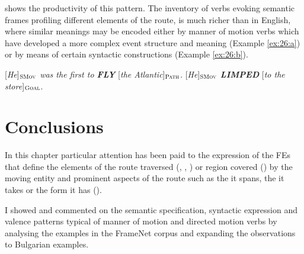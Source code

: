 \documentclass[output=paper,colorlinks,citecolor=brown]{langscibook}
\begin{document}
 shows the productivity of this pattern. The inventory of verbs evoking semantic frames profiling different elements of the route, is much richer than in English, where similar meanings may be encoded either by manner of motion verbs which have developed a more complex event structure and meaning (Example \ref{ex:26:a}) or by means of certain syntactic constructions (Example \ref{ex:26:b}). %

\begin{exe}
\ex  \label{ex:26}
\begin{xlist}
\ex  \label{ex:26:a}
[\textit{He}]$_{\text{\textsc{SMov}}}$ \textit{was the first to \textbf{FLY}} [\textit{the Atlantic}]$_{\text{\textsc{Path}}}$.
\ex  \label{ex:26:b}
[\textit{He}]$_{\text{\textsc{SMov}}}$ \textit{\textbf{LIMPED}} [\textit{to the store}]$_{\text{\textsc{Goal}}}$.
\end{xlist}
\end{exe}

\section{Conclusions}


In this chapter particular attention has been paid to the expression of the FEs that define the elements of the route traversed (, , ) or region covered () by the moving entity and prominent aspects of the route such as the  it spans, the  it takes or the form it has ().

I showed and commented on the semantic specification, syntactic expression and valence patterns typical of manner of motion and directed motion verbs by analysing the examples in the FrameNet corpus and expanding the observations to Bulgarian examples. 
\end{document}
